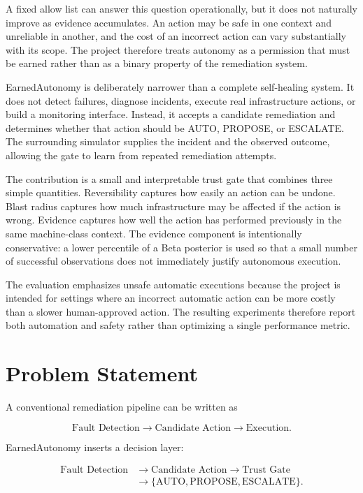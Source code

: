 \documentclass[conference]{IEEEtran}
\begin{document}
A fixed allow list can answer this question operationally, but it does not
naturally improve as evidence accumulates. An action may be safe in one
context and unreliable in another, and the cost of an incorrect action can
vary substantially with its scope. The project therefore treats autonomy as a
permission that must be earned rather than as a binary property of the
remediation system.

EarnedAutonomy is deliberately narrower than a complete self-healing system.
It does not detect failures, diagnose incidents, execute real infrastructure
actions, or build a monitoring interface. Instead, it accepts a candidate
remediation and determines whether that action should be AUTO, PROPOSE, or
ESCALATE. The surrounding simulator supplies the incident and the observed
outcome, allowing the gate to learn from repeated remediation attempts.

The contribution is a small and interpretable trust gate that combines three
simple quantities. Reversibility captures how easily an action can be undone.
Blast radius captures how much infrastructure may be affected if the action is
wrong. Evidence captures how well the action has performed previously in the
same machine-class context. The evidence component is intentionally
conservative: a lower percentile of a Beta posterior is used so that a small
number of successful observations does not immediately justify autonomous
execution.

The evaluation emphasizes unsafe automatic executions because the project is
intended for settings where an incorrect automatic action can be more costly
than a slower human-approved action. The resulting experiments therefore
report both automation and safety rather than optimizing a single performance
metric.

\section{Problem Statement}
A conventional remediation pipeline can be written as

\begin{equation}
\text{Fault Detection}
\rightarrow
\text{Candidate Action}
\rightarrow
\text{Execution}.
\end{equation}

EarnedAutonomy inserts a decision layer:

\begin{equation}
\begin{aligned}
\text{Fault Detection}
&\rightarrow \text{Candidate Action}
\rightarrow \text{Trust Gate}\\
&\rightarrow \{\text{AUTO},\text{PROPOSE},\text{ESCALATE}\}.
\end{aligned}
\end{equation}
\end{document}
